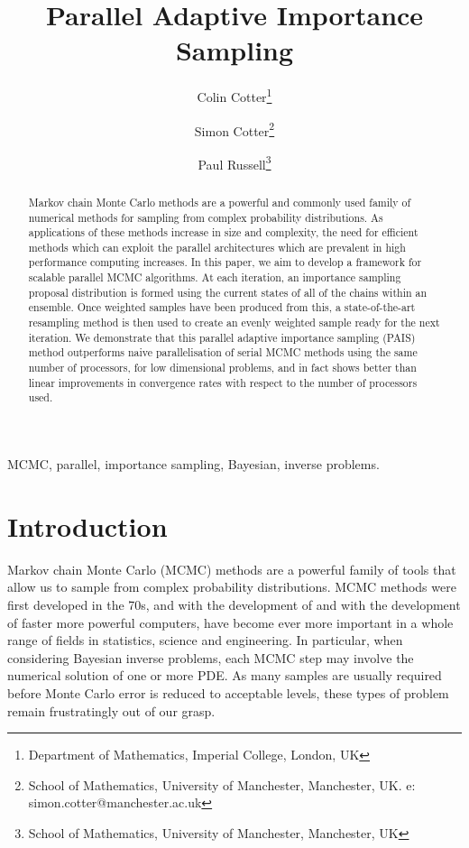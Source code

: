 \documentclass[final]{siamltex}
\author{Colin Cotter\thanks{Department of Mathematics, Imperial
    College, London, UK} \and Simon Cotter\thanks{School of
    Mathematics, University of Manchester, Manchester, UK. e: simon.cotter@manchester.ac.uk} \and Paul Russell\thanks{School of
    Mathematics, University of Manchester, Manchester, UK}}
\title{Parallel Adaptive Importance Sampling}
\begin{document}
\maketitle
\begin{abstract}
  Markov chain Monte Carlo methods are a powerful and commonly used
  family of numerical methods for sampling from complex probability
  distributions. As applications of these methods increase in size and complexity, the need for efficient
  methods which can exploit the parallel architectures which are
  prevalent in high performance computing increases. In this paper, we
  aim to develop a framework for scalable parallel MCMC algorithms. At
  each iteration, an importance sampling proposal distribution is
  formed using the current states of all of the chains within an
  ensemble. Once weighted samples have been produced from this, a
  state-of-the-art resampling method is then used to create an evenly
  weighted sample ready for the next iteration. We demonstrate that
  this parallel adaptive importance sampling (PAIS) method outperforms
  naive parallelisation of serial MCMC methods using the same number
  of processors, for low dimensional problems, and in fact shows
  better than linear improvements in convergence rates with respect to
  the number of processors used.
\end{abstract}
\begin{keywords}MCMC, parallel, importance sampling, Bayesian, inverse problems.
\end{keywords}
\section{Introduction}
Markov chain Monte Carlo (MCMC) methods are a powerful family of tools
that allow us to sample from complex probability distributions. MCMC
methods were first developed in the 70s\cite{hastings1970monte}, and
with the development of and with the development of faster more
powerful computers, have become ever more important in a whole range
of fields in statistics, science and engineering.  In particular, when
considering Bayesian inverse problems, each MCMC step may involve the
numerical solution of one or more PDE. As many samples are usually
required before Monte Carlo error is reduced to acceptable levels,
these types of problem remain frustratingly out of our grasp.
\end{document}
